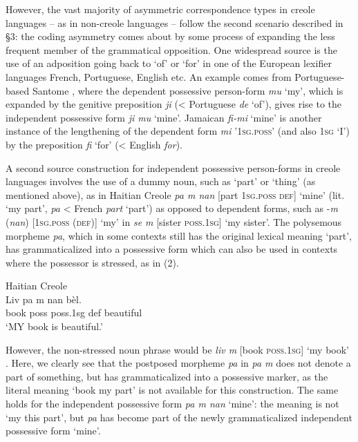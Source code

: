 \documentclass[output=paper]{langsci/langscibook}
\begin{document}
However, the vast majority of asymmetric correspondence types in creole languages – as in non-creole languages – follow the second scenario described in §3: the coding asymmetry comes about by some process of expanding the less frequent member of the grammatical opposition. One widespread source is the use of an adposition going back to `of' or `for' in one of the European lexifier languages French, Portuguese, English etc. An example comes from Portuguese-based Santome \citep{Hagemeijer2013}, where the dependent possessive person-form \textit{mu} `my', which is expanded by the genitive preposition \textit{ji} (< Portuguese \textit{de} `of'), gives rise to the independent possessive form \textit{ji mu} `mine'. Jamaican \textit{fi-mi} `mine' is another instance of the lengthening of the dependent form \textit{mi} \textsc{'1sg.poss'} (and also 1\textsc{sg} `I') by the preposition \textit{fi} `for' (< English \textit{for}).

A second source construction for independent possessive person-forms in creole languages involves the use of a dummy noun, such as `part' or `thing' (as mentioned above), as in Haitian Creole \textit{pa m nan} [part \textsc{1sg.poss} \textsc{def}] `mine' (lit. `my part’, \textit{pa} < French \textit{part} `part') as opposed to dependent forms, such as -\textit{m} (\textit{nan}) [\textsc{1sg.poss} \textsc{(def)]} `my' in \textit{se m} [sister \textsc{poss.1sg]} `my sister'. The polysemous morpheme \textit{pa}, which in some contexts still has the original lexical meaning `part', has grammaticalized into a possessive form which can also be used in contexts where the possessor is stressed, as in (2).

\ea
{Haitian Creole \citep{Fattier2013}  }\\
\gll Liv  pa  m    nan  bèl.\\
     book  poss  poss.1sg  def  beautiful \\
\glt `MY book is beautiful.'
\z

However, the non-stressed noun phrase would be \textit{liv m} [book \textsc{poss.1sg]} `my book' \citep{Fattier2013}. Here, we clearly see that the postposed morpheme \textit{pa} in \textit{pa m} does not denote a part of something, but has grammaticalized into a possessive marker, as the literal meaning `book my part' is not available for this construction. The same holds for the independent possessive form \textit{pa m nan} `mine': the meaning is not `my this part', but \textit{pa} has become part of the newly grammaticalized independent possessive form `mine'. 
\end{document}
